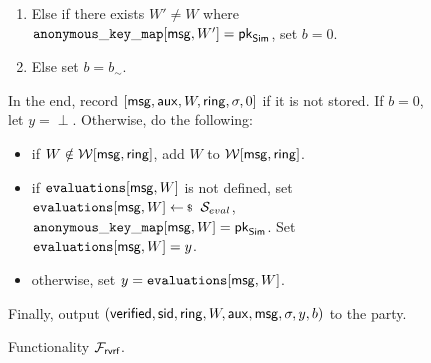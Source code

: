\begin{figure}
\begin{tcolorbox}[left=2pt,right=2pt]
{\begin{list}{\hspace*{1pt} C}{\setlength\leftmargin{0.15in}}
\begin{enumerate}
						\item Else if there exists $ W' \neq W $ where  $ \mathtt{anonymous\_key\_map}[\mathsf{msg},W'] = \mathsf{pk}_{\mathsf{Sim}} $, set $ b = 0 $. \label{cond:differentWforsamepk} 
						\item Else set $ b = b_\sim$. \label{cond:simulatorbit}
					\end{enumerate}		
					
				\end{list}
				In the end,  record $ [\mathsf{msg},\mathsf{aux},W,\mathsf{ring},\sigma, 0] $ if it is not stored. If $ b = 0 $, let $y = \perp $. Otherwise,   do the following:
				\begin{itemize}
					\item if $ W \notin \mathcal{W}[\mathsf{msg},\mathsf{ring}] $, add $ W $ to $ \mathcal{W}[\mathsf{msg},\mathsf{ring}]  $.
					\item if $ \texttt{evaluations}[\mathsf{msg},W] $ is not defined, set $ \evaluationslist[\msg, W]\leftsample \setsym{S}_{eval}$, $ \mathtt{anonymous\_key\_map}[\mathsf{msg},W]  = \mathsf{pk}_{\mathsf{Sim}}$.  Set $ \texttt{evaluations}[\mathsf{msg}, W] = y$.
					\item otherwise, set $ y = \texttt{evaluations}[\mathsf{msg}, W]$. 	
				\end{itemize}
				Finally, output $(\mathsf{verified}, \textsf{sid}, \mathsf{ring},W, \mathsf{aux},\mathsf{msg}, \sigma, y, b)$ to the party.
				
				
				
			}
		\end{tcolorbox}
		\caption{Functionality $\mathcal{F}_{\textsf{rvrf}}$.\label{f:gvrf}}
	\end{figure}
	
	
